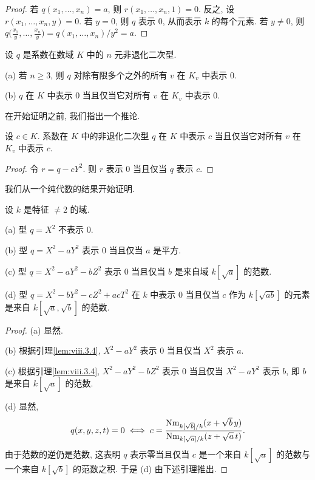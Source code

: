 \begin{proof}
若 $q(x_1,\ldots,x_n)=a$, 则 $r(x_1,\ldots,x_n,1)=0$. 反之, 设 $r(x_1,\ldots,x_n,y)=0$. 若 $y=0$, 则 $q$ 表示 $0$, 从而表示 $k$ 的每个元素. 若 $y\ne 0$, 则 $q\big(\frac{x_1}{y},\ldots,\frac{x_n}{y}\big)=q(x_1,\ldots,x_n)/y^{2}=a$.
\end{proof}

\begin{theorem}\label{thm:viii.3.5}
设 $q$ 是系数在数域 $K$ 中的 $n$ 元非退化二次型.

(a) 若 $n\ge 3$, 则 $q$ 对除有限多个之外的所有 $v$ 在 $K_v$ 中表示 $0$.

(b) $q$ 在 $K$ 中表示 $0$ 当且仅当它对所有 $v$ 在 $K_v$ 中表示 $0$.
\end{theorem}

在开始证明之前, 我们指出一个推论.

\begin{corollary}\label{cor:viii.3.6}
设 $c\in K$. 系数在 $K$ 中的非退化二次型 $q$ 在 $K$ 中表示 $c$ 当且仅当它对所有 $v$ 在 $K_v$ 中表示 $c$.
\end{corollary}

\begin{proof}
令 $r=q-cY^{2}$. 则 $r$ 表示 $0$ 当且仅当 $q$ 表示 $c$.
\end{proof}

我们从一个纯代数的结果开始证明.

\begin{proposition}\label{prop:viii.3.7}
设 $k$ 是特征 $\ne 2$ 的域.

(a) 型 $q=X^{2}$ 不表示 $0$.

(b) 型 $q=X^{2}-aY^{2}$ 表示 $0$ 当且仅当 $a$ 是平方.

(c) 型 $q=X^{2}-aY^{2}-bZ^{2}$ 表示 $0$ 当且仅当 $b$ 是来自域 $k[\sqrt{a}]$ 的范数.

(d) 型 $q=X^{2}-bY^{2}-cZ^{2}+acT^{2}$ 在 $k$ 中表示 $0$ 当且仅当 $c$ 作为 $k[\sqrt{ab}]$ 的元素是来自 $k[\sqrt{a},\sqrt{b}]$ 的范数.
\end{proposition}

\begin{proof}
(a) 显然.

(b) 根据引理\ref{lem:viii.3.4}, $X^{2}-aY^{2}$ 表示 $0$ 当且仅当 $X^{2}$ 表示 $a$.

(c) 根据引理\ref{lem:viii.3.4}, $X^{2}-aY^{2}-bZ^{2}$ 表示 $0$ 当且仅当 $X^{2}-aY^{2}$ 表示 $b$, 即 $b$ 是来自 $k[\sqrt{a}]$ 的范数.

(d) 显然,
\[
q(x,y,z,t)=0\iff c=\frac{\operatorname{Nm}_{k[\sqrt{b}]/k}(x+\sqrt{b}\,y)}{\operatorname{Nm}_{k[\sqrt{a}]/k}(z+\sqrt{a}\,t)}.
\]
由于范数的逆仍是范数, 这表明 $q$ 表示零当且仅当 $c$ 是一个来自 $k[\sqrt{a}]$ 的范数与一个来自 $k[\sqrt{b}]$ 的范数之积. 于是 (d) 由下述引理推出.
\end{proof}

